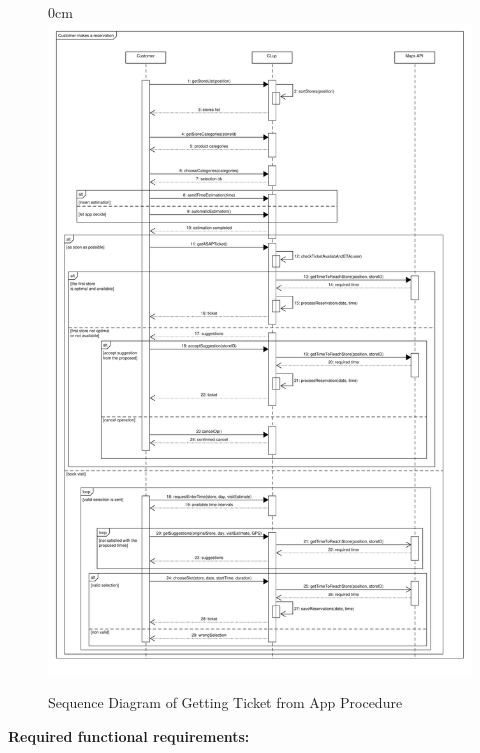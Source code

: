 \documentclass{article}
\begin{document}
\begin{center}
							\begin{figure}
								\begin{adjustwidth} {0cm}{}
									\centering
									\includegraphics[scale=0.33]{SD/5_makeReservation.pdf}\\
									\caption{Sequence Diagram of Getting Ticket from App Procedure}
								\end{adjustwidth}
							\end{figure}

\begin{itemize}
					\bigskip
					\bigskip
					\bigskip
					 {\bfseries Required functional requirements: }



\end{itemize}
\end{center}
\end{document}
